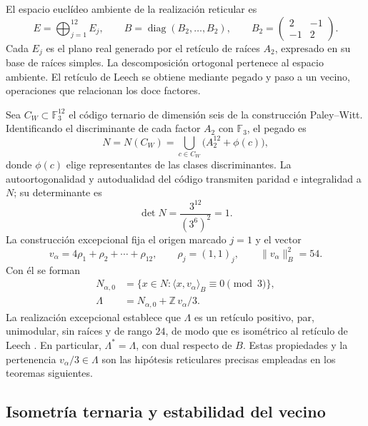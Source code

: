 \documentclass[a4paper,10pt]{article}
\theoremstyle{definition}\newtheorem{definition}[theorem]{Definición}
\theoremstyle{remark}\newtheorem{remark}[theorem]{Observación}
\numberwithin{equation}{section}
\begin{document}
El espacio euclídeo ambiente de la realización reticular es
\begin{equation}
 E=\bigoplus_{j=1}^{12}E_j,\qquad
 B=\operatorname{diag}(B_2,\ldots,B_2),\qquad
 B_2=\begin{pmatrix}2&-1\\-1&2\end{pmatrix}.
 \label{eq:leech-ambient}
\end{equation}
Cada \(E_j\) es el plano real generado por el retículo de raíces
\(A_2\), expresado en su base de raíces simples. La descomposición
ortogonal pertenece al espacio ambiente. El retículo de Leech se
obtiene mediante pegado y paso a un vecino, operaciones que relacionan
los doce factores.

Sea \(C_W\subset\mathbb F_3^{12}\) el código ternario de dimensión seis
de la construcción Paley--Witt. Identificando el discriminante de cada
factor \(A_2\) con \(\mathbb F_3\), el pegado es
\[
 N=N(C_W)=
 \bigcup_{c\in C_W}\bigl(A_2^{12}+\phi(c)\bigr),
\]
donde \(\phi(c)\) elige representantes de las clases discriminantes.
La autoortogonalidad y autodualidad del código transmiten paridad e
integralidad a \(N\); su determinante es
\[
 \det N=\frac{3^{12}}{(3^6)^2}=1.
\]
La construcción excepcional fija el origen marcado \(j=1\) y el
vector
\begin{equation}
 v_\alpha=4\rho_1+\rho_2+\cdots+\rho_{12},
 \qquad \rho_j=(1,1)_j,\qquad
 \|v_\alpha\|_B^2=54.
 \label{eq:leech-marked-vector}
\end{equation}
Con él se forman
\begin{equation}
\begin{split}
 N_{\alpha,0}
  &=\{x\in N:\langle x,v_\alpha\rangle_B\equiv0\pmod3\},\\
 \Lambda&=N_{\alpha,0}+\mathbb Z\,v_\alpha/3.
\end{split}
\label{eq:leech-neighbour}
\end{equation}
La realización excepcional establece que \(\Lambda\) es un retículo
positivo, par, unimodular, sin raíces y de rango \(24\), de modo que es
isométrico al retículo de Leech \cite{HMT-IV}. En particular,
\(\Lambda^*=\Lambda\), con dual respecto de \(B\).
Estas propiedades y la pertenencia \(v_\alpha/3\in\Lambda\) son las
hipótesis reticulares precisas empleadas en los teoremas siguientes.

\subsection{Isometría ternaria y estabilidad del vecino}
\label{subsec:leech-c3}
\end{document}
